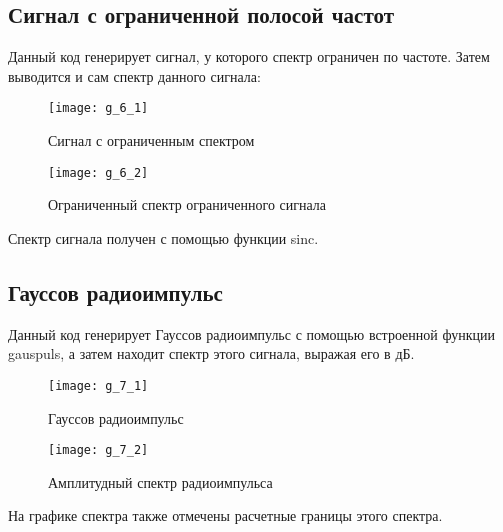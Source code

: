 \subsection{Сигнал с ограниченной полосой частот}


\parindent=1cm
Данный код генерирует сигнал, у которого спектр ограничен по частоте. Затем выводится и сам спектр данного сигнала:

\begin{figure}[H]
	\begin{center}
		\texttt{[image: g\_6\_1]}
		\caption{Сигнал с ограниченным спектром} 
		\label{pic:g_6_1} %
	\end{center}
\end{figure}
\begin{figure}[H]
	\begin{center}
		\texttt{[image: g\_6\_2]}
		\caption{Ограниченный спектр ограниченного сигнала} 
		\label{pic:g_6_2} %
	\end{center}
\end{figure}
Спектр сигнала получен с помощью функции sinc.

\subsection{Гауссов радиоимпульс}


\parindent=1cm
Данный код генерирует Гауссов радиоимпульс с помощью встроенной функции gauspuls, а затем находит спектр этого сигнала, выражая его в дБ.

\begin{figure}[H]
	\begin{center}
		\texttt{[image: g\_7\_1]}
		\caption{Гауссов радиоимпульс} 
		\label{pic:g_7_1} %
	\end{center}
\end{figure}
\begin{figure}[H]
	\begin{center}
		\texttt{[image: g\_7\_2]}
		\caption{Амплитудный спектр радиоимпульса} 
		\label{pic:g_7_2} %
	\end{center}
\end{figure}
На графике спектра также отмечены расчетные границы этого спектра.

